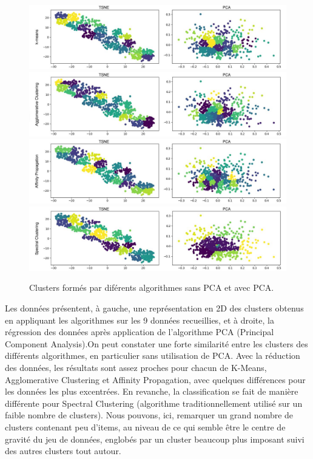 \documentclass[soumission]{ir}
\begin{document}
\begin{figure}
        \centering
        \includegraphics[scale = 0.30]{images/cluster_kmean.jpg}
        \includegraphics[scale = 0.30]{images/cluster_agglo.jpg}
        \includegraphics[scale = 0.30]{images/cluster_affinity.jpg}
        \includegraphics[scale = 0.30]{images/cluster_spectral.jpg}
        \caption{Clusters formés par diférents algorithmes sans PCA et avec PCA.}
        \label{clusters}
\end{figure}

Les données présentent, à gauche, une représentation en 2D des clusters obtenus en appliquant les algorithmes 
sur les 9 données recueillies, et à droite, la régression des données après application de l’algorithme PCA 
(Principal Component Analysis).On peut constater une forte similarité entre les clusters des différents 
algorithmes, en particulier sans utilisation de PCA. Avec la réduction des données, les résultats sont assez 
proches pour chacun de K-Means, Agglomerative Clustering et Affinity Propagation, avec quelques différences pour
 les données les plus excentrées. En revanche, la classification se fait de manière différente pour Spectral 
 Clustering (algorithme traditionnellement utilisé sur un faible nombre de clusters). Nous pouvons, ici, 
 remarquer un grand nombre de clusters contenant peu d’items, au niveau de ce qui semble être le centre de 
 gravité du jeu de données, englobés par un cluster beaucoup plus imposant suivi des autres clusters tout autour.
\end{document}
